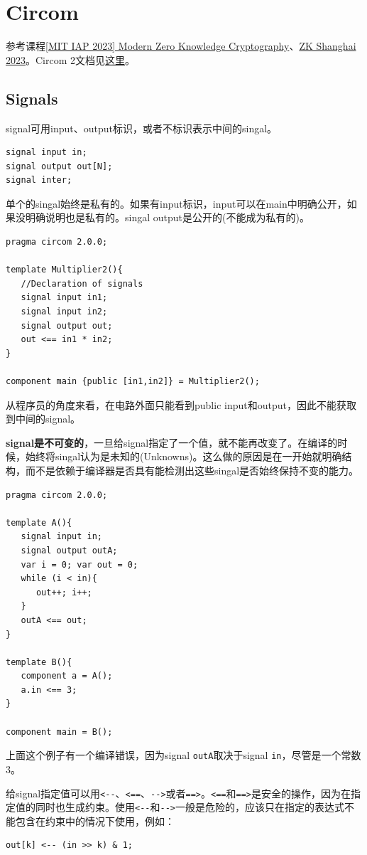 \documentclass[10pt]{ctexart}
\begin{document}
 


\section{Circom}
参考课程\href{https://zkiap.com/}{[MIT IAP 2023] Modern Zero Knowledge Cryptography}、\href{https://zkshanghai.xyz/}{ZK Shanghai 2023}。Circom 2文档见\href{https://docs.circom.io/circom-language/signals/}{这里}。

\subsection{Signals}
signal可用input、output标识，或者不标识表示中间的singal。
\begin{lstlisting}
signal input in;
signal output out[N];
signal inter;
\end{lstlisting}
单个的singal始终是私有的。如果有input标识，input可以在main中明确公开，如果没明确说明也是私有的。singal output是公开的(不能成为私有的)。
\begin{lstlisting}
pragma circom 2.0.0;

template Multiplier2(){
   //Declaration of signals
   signal input in1;
   signal input in2;
   signal output out;
   out <== in1 * in2;
}

component main {public [in1,in2]} = Multiplier2();
\end{lstlisting}

从程序员的角度来看，在电路外面只能看到public input和output，因此不能获取到中间的signal。

\textbf{signal是不可变的}，一旦给signal指定了一个值，就不能再改变了。在编译的时候，始终将singal认为是未知的(Unknowns)。这么做的原因是在一开始就明确结构，而不是依赖于编译器是否具有能检测出这些singal是否始终保持不变的能力。
\begin{lstlisting}
pragma circom 2.0.0;

template A(){
   signal input in;
   signal output outA; 
   var i = 0; var out = 0;
   while (i < in){
      out++; i++;
   }
   outA <== out;
}

template B(){
   component a = A();
   a.in <== 3;
}

component main = B();
\end{lstlisting}
上面这个例子有一个编译错误，因为signal \verb|outA|取决于signal \verb|in|，尽管是一个常数3。

给signal指定值可以用\verb|<--|、\verb|<==|、\verb|-->|或者\verb|==>|。\verb|<==|和\verb|==>|是安全的操作，因为在指定值的同时也生成约束。使用\verb|<--|和\verb|-->|一般是危险的，应该只在指定的表达式不能包含在约束中的情况下使用，例如：
\begin{lstlisting}
out[k] <-- (in >> k) & 1;
\end{lstlisting}
\end{document}
